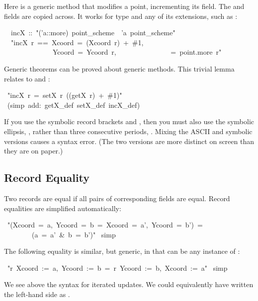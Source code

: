 Here is a generic method that modifies a point, incrementing its
 field.  The  and  fields
are copied across.  It works for type  and any of its
extensions, such as :
\begin{isabelle}
\isanewline
\ \ incX\ ::\ "('a::more)\ point_scheme\ \isasymRightarrow \ 'a\ point_scheme"\isanewline
\ \ "incX\ r\ ==\ \isasymlparr Xcoord\ =\ (Xcoord\ r)\ +\
\#1,\isanewline
\ \ \ \ \ \ \ \ \ \ \ \ \ \ Ycoord\ =\ Ycoord\ r,\isanewline
\ \ \ \ \ \ \ \ \ \ \ \ \ \ \isasymdots \ =\ point.more\
r\isasymrparr"
\end{isabelle}

Generic theorems can be proved about generic methods.  This trivial
lemma relates  to  and :
\begin{isabelle}
\isacommand{lemma}\ "incX\ r\ =\ setX\ r\ ((getX\ r)\ +\ \#1)"\isanewline
\isacommand{by}\ (simp\ add:\ getX_def\ setX_def\ incX_def)
\end{isabelle}

\begin{warn}
If you use the symbolic record brackets \isa{\isasymlparr} and 
\isa{\isasymrparr}, then you must also use the symbolic ellipsis,
\isa{\isasymdots}, rather than three consecutive periods,
\isa{...}.  Mixing the ASCII and symbolic versions
causes a syntax error.  (The two versions are more
distinct on screen than they are on paper.)
\end{warn}%


\subsection{Record Equality}

Two records are equal
if all pairs of corresponding fields are equal. 
Record equalities are simplified automatically:
\begin{isabelle}
\isacommand{lemma}\ "(\isasymlparr Xcoord\ =\ a,\ Ycoord\ =\ b\isasymrparr \ =\ \isasymlparr Xcoord\ =\ a',\ Ycoord\ =\ b'\isasymrparr )\
=\isanewline
\ \ \ \ \ \ \ \ (a\ =\ a'\ \&\ b\ =\ b')"\isanewline
\isacommand{by}\ simp
\end{isabelle}

The following equality is similar, but generic, in that  can
be any instance of :
\begin{isabelle}
\isacommand{lemma}\ "r\ \isasymlparr Xcoord\ :=\ a,\ Ycoord\ :=\
b\isasymrparr \ =\ r\ \isasymlparr Ycoord\ :=\ b,\ Xcoord\ :=\
a\isasymrparr "\isanewline
\isacommand{by}\ simp
\end{isabelle}
We see above the syntax for iterated updates.  We could equivalently
have written the left-hand side as
.


